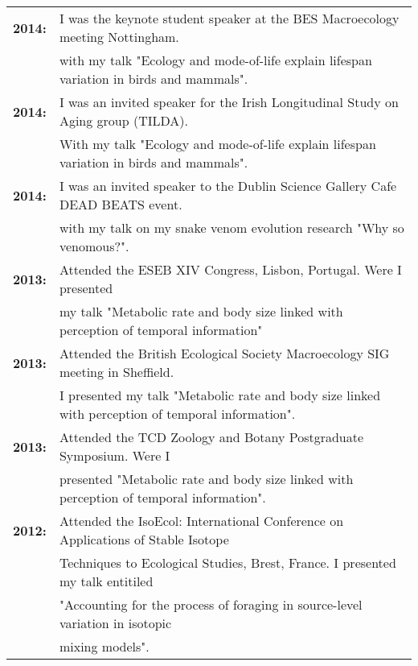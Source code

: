 \documentclass[10pt,a4paper]{article}
\begin{document}
\begin{flushleft}
\begin{tabular}{ll}
\textbf{2014:} & I was the keynote student speaker at the BES Macroecology meeting Nottingham.\\ 
& with my talk "Ecology and mode-of-life explain lifespan variation in birds and mammals".\\
\textbf{2014:} & I was an invited speaker for the Irish Longitudinal Study on Aging group (TILDA).\\ 
& With my talk "Ecology and mode-of-life explain lifespan variation in birds and mammals".\\
\textbf{2014:} & I was an invited speaker to the Dublin Science Gallery Cafe DEAD BEATS event.\\ 
& with my talk on my snake venom evolution research "Why so venomous?".\\
\textbf{2013:} & Attended the ESEB XIV Congress, Lisbon, Portugal. Were I presented\\
& my talk "Metabolic rate and body size linked with perception of temporal information"\\
\textbf{2013:} & Attended the British Ecological Society Macroecology SIG meeting in Sheffield.\\
& I presented my talk "Metabolic rate and body size linked with perception of temporal information".\\
\textbf{2013:} & Attended the TCD Zoology and Botany Postgraduate Symposium. Were I\\
& presented "Metabolic rate and body size linked with perception of temporal information".\\
\textbf{2012:} & Attended the IsoEcol: International Conference on Applications of Stable Isotope\\
&Techniques to Ecological Studies, Brest, France. I presented my talk entitiled\\
&"Accounting for the process of foraging in source-level variation in isotopic\\
& mixing models".\\


\end{tabular}

\pagebreak 

\end{flushleft}
\end{document}
